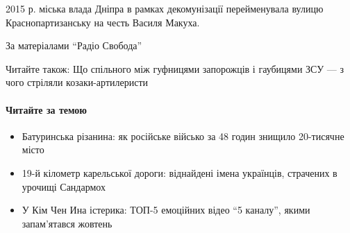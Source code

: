 2015 р. міська влада Дніпра в рамках декомунізації перейменувала вулицю
Краснопартизанську на честь Василя Макуха.

За матеріалами \enquote{Радіо Свобода}

Читайте також: Що спільного між гуфницями запорожців і гаубицями ЗСУ --- з
чого стріляли козаки-артилеристи

\paragraph{Читайте за темою}

\begin{itemize}
\item Батуринська різанина: як російське військо за 48 годин знищило 20-тисячне
місто

\item 19-й кілометр карельської дороги: віднайдені імена українців, страчених в
урочищі Сандармох

\item У Кім Чен Ина істерика: ТОП-5 емоційних відео \enquote{5 каналу}, якими запам'ятався
жовтень
\end{itemize}

